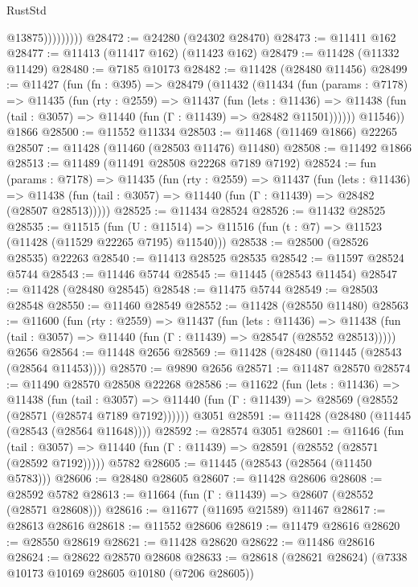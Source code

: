 \begin{lexlean}{RustStd}
\begin{coremodule}
                      @13875)))))))))
@28472 := @24280 (@24302 @28470)
@28473 := @11411 @162
@28477 := @11413 (@11417 @162) (@11423 @162)
@28479 := @11428 (@11332 @11429)
@28480 := @7185 @10173
@28482 := @11428 (@28480 @11456)
@28499 := @11427
    (fun (fn : @395) =>
    @28479
      (@11432
        (@11434
          (fun (params : @7178) =>
          @11435
            (fun (rty : @2559) =>
            @11437
              (fun (lets : @11436) =>
              @11438 (fun (tail : @3057) => @11440 (fun (Γ : @11439) => @28482 @11501))))))
        @11546))
    @1866
@28500 := @11552 @11334
@28503 := @11468 (@11469 @1866) @22265
@28507 := @11428 (@11460 (@28503 @11476) @11480)
@28508 := @11492 @1866
@28513 := @11489 (@11491 @28508 @22268 @7189 @7192)
@28524 := fun (params : @7178) =>
  @11435
    (fun (rty : @2559) =>
    @11437
      (fun (lets : @11436) =>
      @11438 (fun (tail : @3057) => @11440 (fun (Γ : @11439) => @28482 (@28507 @28513)))))
@28525 := @11434 @28524
@28526 := @11432 @28525
@28535 := @11515
    (fun (U : @11514) => @11516 (fun (t : @7) => @11523 (@11428 (@11529 @22265 @7195) @11540)))
@28538 := @28500 (@28526 @28535) @22263
@28540 := @11413 @28525 @28535
@28542 := @11597 @28524 @5744
@28543 := @11446 @5744
@28545 := @11445 (@28543 @11454)
@28547 := @11428 (@28480 @28545)
@28548 := @11475 @5744
@28549 := @28503 @28548
@28550 := @11460 @28549
@28552 := @11428 (@28550 @11480)
@28563 := @11600
    (fun (rty : @2559) =>
    @11437
      (fun (lets : @11436) =>
      @11438 (fun (tail : @3057) => @11440 (fun (Γ : @11439) => @28547 (@28552 @28513)))))
    @2656
@28564 := @11448 @2656
@28569 := @11428 (@28480 (@11445 (@28543 (@28564 @11453))))
@28570 := @9890 @2656
@28571 := @11487 @28570
@28574 := @11490 @28570 @28508 @22268
@28586 := @11622
    (fun (lets : @11436) =>
    @11438
      (fun (tail : @3057) =>
      @11440 (fun (Γ : @11439) => @28569 (@28552 (@28571 (@28574 @7189 @7192))))))
    @3051
@28591 := @11428 (@28480 (@11445 (@28543 (@28564 @11648))))
@28592 := @28574 @3051
@28601 := @11646
    (fun (tail : @3057) => @11440 (fun (Γ : @11439) => @28591 (@28552 (@28571 (@28592 @7192)))))
    @5782
@28605 := @11445 (@28543 (@28564 (@11450 @5783)))
@28606 := @28480 @28605
@28607 := @11428 @28606
@28608 := @28592 @5782
@28613 := @11664 (fun (Γ : @11439) => @28607 (@28552 (@28571 @28608)))
@28616 := @11677 (@11695 @21589) @11467
@28617 := @28613 @28616
@28618 := @11552 @28606
@28619 := @11479 @28616
@28620 := @28550 @28619
@28621 := @11428 @28620
@28622 := @11486 @28616
@28624 := @28622 @28570 @28608
@28633 := @28618 (@28621 @28624) (@7338 @10173 @10169 @28605 @10180 (@7206 @28605))

\end{coremodule}
\end{lexlean}
